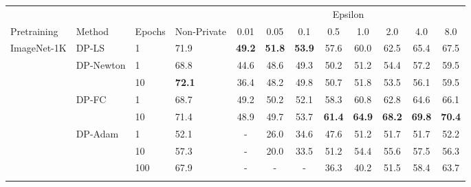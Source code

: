 \documentclass[letterpaper]{article} \usepackage{fullpage}
\begin{document}
\begin{table*}[!h]
	\centering
	\small
	\begin{tabular}{llll|cccccccc}
		\toprule
		\addlinespace[0.1cm]
		& & & & \multicolumn{8}{c}{Epsilon} \\
		\addlinespace[0.1cm]
		\hline
		\addlinespace[0.1cm]
		Pretraining & Method                      & Epochs & Non-Private & 0.01 & 0.05 & 0.1  & 0.5  & 1.0  & 2.0  & 4.0  & 8.0                     \\
		\midrule
		\multirow{8}{*}{ImageNet-1K} &      \multirow{ 1}{*}{DP-LS}
		& 1 & 71.9 & \textbf{49.2} & \textbf{51.8} & \textbf{53.9} & 57.6 & 60.0 & 62.5 & 65.4 & 67.5 \\ \addlinespace[0.1cm]
\addlinespace[0.1cm]
		            & \multirow{ 2}{*}{DP-Newton} & 1      & 68.8        & 44.6 & 48.6 & 49.3 & 50.2 & 51.2 & 54.4 & 57.2 & 59.5                    \\
		            &                             & 10     & \textbf{72.1}        & 36.4 & 48.2 & 49.8 & 50.7 & 51.8 & 53.5 & 56.1 & 59.5                    \\
		\addlinespace[0.1cm]
\addlinespace[0.1cm]
		            & \multirow{ 2}{*}{DP-FC}     & 1      & 68.7        & 49.2 & 50.2 & 52.1 & 58.3 & 60.8 & 62.8 & 64.6 & 66.1                    \\
		            &                             & 10     & 71.4        & 48.9 & 49.7 & 53.7 & \textbf{61.4} & \textbf{64.9} & \textbf{68.2} & \textbf{69.8} & \textbf{70.4}                    \\
		\addlinespace[0.1cm]
\addlinespace[0.1cm]
		            & \multirow{ 3}{*}{DP-Adam}   & 1      & 52.1        & -   & 26.0 & 34.6 & 47.6 & 51.2 & 51.7 & 51.7 & 52.2                    \\
		            &                             & 10     & 57.3        & -   & 20.0 & 33.5 & 51.2 & 54.4 & 55.6 & 57.5 & 56.3                    \\
		            &                             & 100    & 67.9        & -   & -   & -   & 36.3 & 40.2 & 51.5 & 58.4 & 63.7                    \\
		\addlinespace[0.2cm]
		\hline
		\addlinespace[0.2cm]
		        

\end{tabular}
\end{table*}
\end{document}
